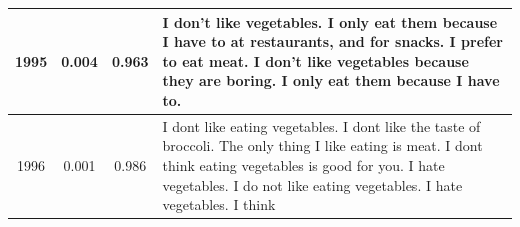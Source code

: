 \begin{table}[ht]
\begin{center}
\begin{tabular}{cccp{8.5cm}}
    \midrule
    1995 & 0.004 & 0.963 & I don't like vegetables. I only eat them because I have to at restaurants, and for snacks. I prefer to eat meat. I don't like vegetables because they are boring. I only eat them because I have to. \\
    \midrule
    1996 & 0.001 & 0.986 & I dont like eating vegetables. I dont like the taste of broccoli. The only thing I like eating is meat. I dont think eating vegetables is good for you. I hate vegetables. I do not like eating vegetables. I hate vegetables. I think \\
    \bottomrule
  \end{tabular}
  \end{center}
  \label{app:iter_opinions_b4}
\end{table}